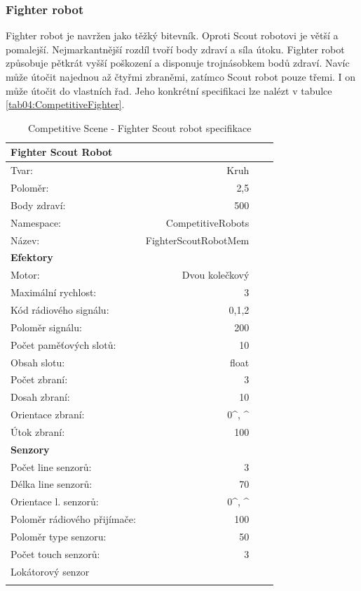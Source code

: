 \subsubsection{Fighter robot}
Fighter robot je navržen jako těžký bitevník. Oproti Scout robotovi je větší a pomalejší. Nejmarkantnější rozdíl tvoří body zdraví a síla útoku. Fighter robot způsobuje pětkrát vyšší poškození a disponuje trojnásobkem bodů zdraví.  Navíc může útočit najednou až čtyřmi zbraněmi, zatímco Scout robot pouze třemi. I on může útočit do vlastních řad. 
Jeho konkrétní specifikaci lze nalézt v tabulce \ref{tab04:CompetitiveFighter}.
\clearpage
\begin{table}[h]\centering
	\begin{tabular}{l@{\hspace{1.0cm}}D{.}{,}{2.2}D{.}{,}{2.2}D{.}{,}{2.3}}
		\toprule
		\textbf{Fighter Scout Robot} \\
		\midrule
		Tvar: & Kruh\\
		Poloměr: & 2,5\\
		Body zdraví: &500\\
		Namespace: & CompetitiveRobots\\
		Název: & FighterScoutRobotMem \\
		\midrule
		\textbf{Efektory} \\
		\midrule
		Motor: & Dvou kolečkový \\
		Maximální rychlost: & 3 \\
		Kód rádiového signálu: & 0,1,2\\
		Poloměr signálu: & 200\\
		Počet paměťových slotů: &10 \\
		Obsah slotu: & float\\
		Počet zbraní: & 3\\
		Dosah zbraní: & 10\\
		Orientace zbraní: &  0^\circ, ^\circ\\
		Útok zbraní: & 100\\
		\midrule
		\textbf{Senzory} \\
		\midrule
		Počet line senzorů: &  3\\
		Délka line senzorů: & 70\\
		Orientace l. senzorů: & 0^\circ, ^\circ\\
		Poloměr rádiového přijímače: & 100 \\
		Poloměr type senzoru: & 50\\
		Počet touch senzorů: & 3 \\  
		Lokátorový senzor\\ 
		\bottomrule
	\end{tabular}
	\caption{Competitive Scene - Fighter Scout robot specifikace }
	\label{tab04:CompetiveScout}
\end{table}
\clearpage

